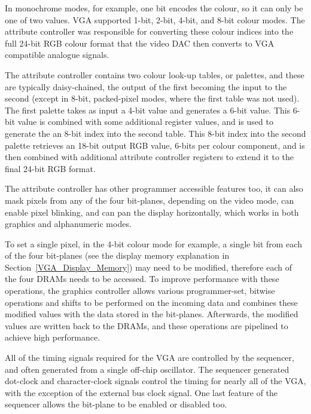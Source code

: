 In monochrome modes, for example, one bit encodes the colour, so it can only be
one of two values. VGA supported 1-bit, 2-bit, 4-bit, and 8-bit colour modes. The
attribute controller was responsible for converting these colour indices into the
full 24-bit RGB colour format that the video DAC then converts to VGA compatible
analogue signals.

The attribute controller contains two colour look-up tables, or palettes, and
these are typically daisy-chained, the output of the first becoming the input to
the second (except in 8-bit, packed-pixel modes, where the first table was not
used). The first palette takes as input a 4-bit value and generates a 6-bit
value. This 6-bit value is combined with some additional register values, and is
used to generate the an 8-bit index into the second table. This 8-bit index into
the second palette retrieves an 18-bit output RGB value, 6-bits per colour
component, and is then combined with additional attribute controller registers to
extend it to the final 24-bit RGB format.

The attribute controller has other programmer accessible features too, it can
also mask pixels from any of the four bit-planes, depending on the video mode, can
enable pixel blinking, and can pan the display horizontally, which works in both
graphics and alphanumeric modes.

To set a single pixel, in the 4-bit colour mode for example, a single bit from
each of the four bit-planes (see the display memory explanation in
Section~\ref{VGA_Display_Memory}) may need to be modified, therefore each of the
four DRAMs needs to be accessed. To improve performance with these operations,
the graphics controller allows various programmer-set, bitwise operations and
shifts to be performed on the incoming data and combines these modified values
with the data stored in the bit-planes. Afterwards, the modified values are
written back to the DRAMs, and these operations are pipelined to achieve high
performance.

All of the timing signals required for the VGA are controlled by the sequencer,
and often generated from a single off-chip oscillator. The sequencer generated
dot-clock and character-clock signals control the timing for nearly all of the
VGA, with the exception of the external bus clock signal. One last feature of the
sequencer allows the bit-plane to be enabled or disabled too.

